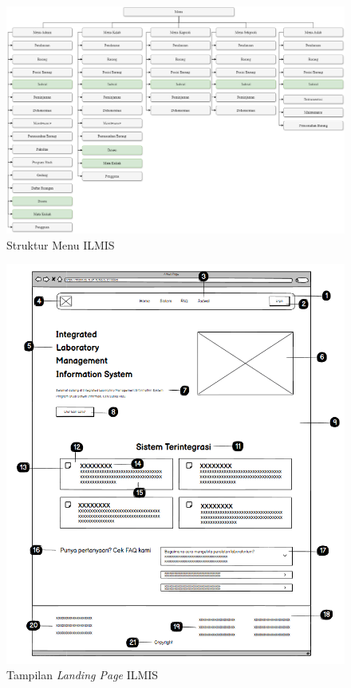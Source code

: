 \begin{figure}
	\centering
	\includegraphics[width=1\textwidth]{konten/gambar/menu.png}
	\caption{Struktur Menu ILMIS}
	\label{StrukturMenuILMIS}
\end{figure}

\begin{figure}
	\centering
	\includegraphics[width=1\textwidth]{konten/gambar/landing-page.png}
	\caption{Tampilan \textit{Landing Page} ILMIS}
	\label{fig:landing-page-interface}
\end{figure}

